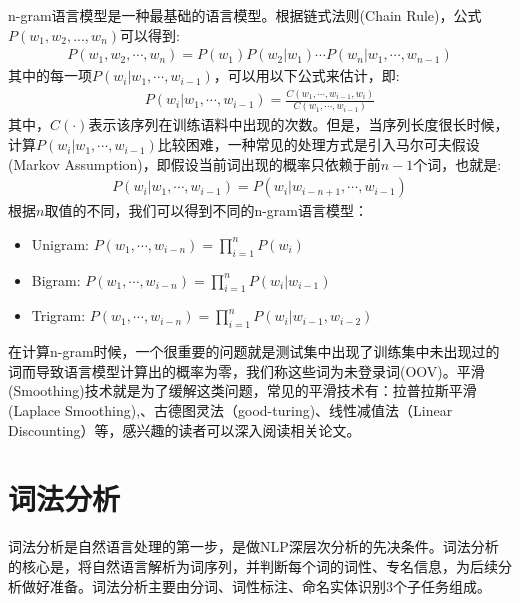 \documentclass[graybox,envcountchap,sectrefs]{svmono}
\begin{document}
n-gram语言模型是一种最基础的语言模型。根据链式法则(Chain Rule)，公式$P(w_1, w_2, ..., w_n)$可以得到:
\begin{equation} \nonumber
\label{equ:ab}
\begin{aligned}
P(w_1, w_2, \cdots, w_n)=P(w_1)P(w_2|w_1)\cdots P(w_n|w_1,\cdots,w_{n-1})
\end{aligned}
\end{equation}
其中的每一项$P(w_i|w_1,\cdots,w_{i-1})$，可以用以下公式来估计，即:
\begin{equation} \nonumber
\label{equ:ab}
\begin{aligned}
P(w_i|w_1,\cdots,w_{i-1}) = \frac{C(w_1,\cdots, w_{i-1}, w_i) }{C(w_1,\cdots,w_{i-1})}
\end{aligned}
\end{equation}
其中，$C(\cdot)$表示该序列在训练语料中出现的次数。但是，当序列长度很长时候，计算$P(w_i|w_1,\cdots,w_{i-1})$比较困难，一种常见的处理方式是引入马尔可夫假设(Markov Assumption)，即假设当前词出现的概率只依赖于前$n-1$个词，也就是:
\begin{equation} \nonumber
\label{equ:ab}
\begin{aligned}
P(w_i|w_1,\cdots,w_{i-1}) = P(w_i|w_{i-n+1},\cdots,w_{i-1})
\end{aligned}
\end{equation}
根据$n$取值的不同，我们可以得到不同的n-gram语言模型：
\begin{itemize}
    \item Unigram: $P(w_1, \cdots, w_{i-n})=\prod_{i=1}^{n} P(w_i)$
	\item Bigram: $P(w_1, \cdots, w_{i-n})=\prod_{i=1}^{n} P(w_i|w_{i-1})$
	\item Trigram: $P(w_1, \cdots, w_{i-n})=\prod_{i=1}^{n} P(w_i|w_{i-1},w_{i-2})$
\end{itemize}

在计算n-gram时候，一个很重要的问题就是测试集中出现了训练集中未出现过的词而导致语言模型计算出的概率为零，我们称这些词为未登录词(OOV)。平滑(Smoothing)技术就是为了缓解这类问题，常见的平滑技术有：拉普拉斯平滑(Laplace Smoothing),、古德图灵法（good-turing)、线性减值法（Linear Discounting）等，感兴趣的读者可以深入阅读相关论文。


\section{词法分析}
词法分析是自然语言处理的第一步，是做NLP深层次分析的先决条件。词法分析的核心是，将自然语言解析为词序列，并判断每个词的词性、专名信息，为后续分析做好准备。词法分析主要由分词、词性标注、命名实体识别3个子任务组成。
\end{document}
